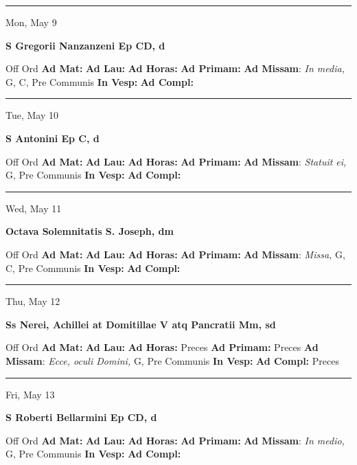 \documentclass[letterpaper, 10pt]{article}
\begin{document}
\hrule
\begin{center}
Mon, May 9
\end{center}\textbf{ \large S Gregorii Nanzanzeni Ep CD, \textnormal{\normalsize d}}
\begin{justify}
Off Ord
\textbf{Ad Mat: }
\textbf{Ad Lau: }
\textbf{Ad Horas: }
\textbf{Ad Primam: }
\textbf{Ad Missam}: \textit{In media,} G, C, Pre Communis
\textbf{In Vesp: }
\textbf{Ad Compl: }\end{justify}



\hrule
\begin{center}
Tue, May 10
\end{center}\textbf{ \large S Antonini Ep C, \textnormal{\normalsize d}}
\begin{justify}
Off Ord
\textbf{Ad Mat: }
\textbf{Ad Lau: }
\textbf{Ad Horas: }
\textbf{Ad Primam: }
\textbf{Ad Missam}: \textit{Statuit ei,} G, Pre Communis
\textbf{In Vesp: }
\textbf{Ad Compl: }\end{justify}



\hrule
\begin{center}
Wed, May 11
\end{center}\textbf{ \large Octava Solemnitatis S. Joseph, \textnormal{\normalsize dm}}
\begin{justify}
Off Ord
\textbf{Ad Mat: }
\textbf{Ad Lau: }
\textbf{Ad Horas: }
\textbf{Ad Primam: }
\textbf{Ad Missam}: \textit{Missa,} G, C, Pre Communis
\textbf{In Vesp: }
\textbf{Ad Compl: }\end{justify}



\hrule
\begin{center}
Thu, May 12
\end{center}\textbf{ \large Ss Nerei, Achillei at Domitillae V atq Pancratii Mm, \textnormal{\normalsize sd}}
\begin{justify}
Off Ord
\textbf{Ad Mat: }
\textbf{Ad Lau: }
\textbf{Ad Horas: }Preces
\textbf{Ad Primam: }Preces
\textbf{Ad Missam}: \textit{Ecce, oculi Domini,} G, Pre Communis
\textbf{In Vesp: }
\textbf{Ad Compl: }Preces\end{justify}



\hrule
\begin{center}
Fri, May 13
\end{center}\textbf{ \large S Roberti Bellarmini Ep CD, \textnormal{\normalsize d}}
\begin{justify}
Off Ord
\textbf{Ad Mat: }
\textbf{Ad Lau: }
\textbf{Ad Horas: }
\textbf{Ad Primam: }
\textbf{Ad Missam}: \textit{In medio,} G, Pre Communis
\textbf{In Vesp: }
\textbf{Ad Compl: }\end{justify}
\end{document}
